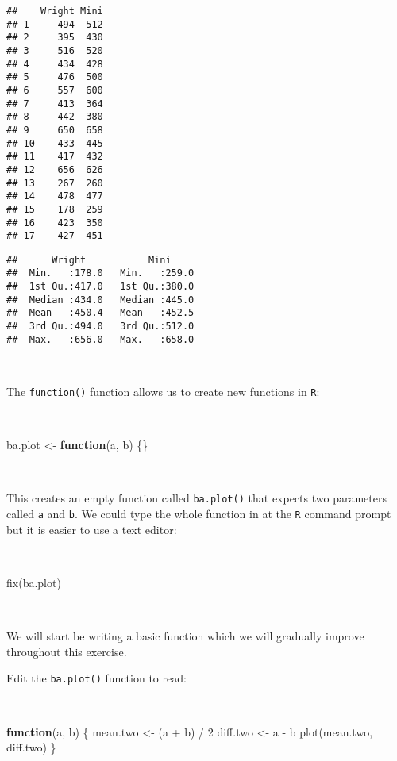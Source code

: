 \documentclass[
  12pt,
  a4paper]{book}
\newenvironment{Shaded}{\begin{snugshade}}{\end{snugshade}}
\newcommand{\ControlFlowTok}[1]{\textcolor[rgb]{0.13,0.29,0.53}{\textbf{#1}}}
\newcommand{\DecValTok}[1]{\textcolor[rgb]{0.00,0.00,0.81}{#1}}
\newcommand{\FunctionTok}[1]{\textcolor[rgb]{0.00,0.00,0.00}{#1}}
\newcommand{\NormalTok}[1]{#1}
\newcommand{\OtherTok}[1]{\textcolor[rgb]{0.56,0.35,0.01}{#1}}
\newcommand{\SpecialCharTok}[1]{\textcolor[rgb]{0.00,0.00,0.00}{#1}}
\begin{document}
\begin{verbatim}
##    Wright Mini
## 1     494  512
## 2     395  430
## 3     516  520
## 4     434  428
## 5     476  500
## 6     557  600
## 7     413  364
## 8     442  380
## 9     650  658
## 10    433  445
## 11    417  432
## 12    656  626
## 13    267  260
## 14    478  477
## 15    178  259
## 16    423  350
## 17    427  451
\end{verbatim}

\begin{verbatim}
##      Wright           Mini      
##  Min.   :178.0   Min.   :259.0  
##  1st Qu.:417.0   1st Qu.:380.0  
##  Median :434.0   Median :445.0  
##  Mean   :450.4   Mean   :452.5  
##  3rd Qu.:494.0   3rd Qu.:512.0  
##  Max.   :656.0   Max.   :658.0
\end{verbatim}

~

The \texttt{function()} function allows us to create new functions in \texttt{R}:

~

\begin{Shaded}
\begin{Highlighting}[]
\NormalTok{ba.plot }\OtherTok{\textless{}{-}} \ControlFlowTok{function}\NormalTok{(a, b) \{\}}
\end{Highlighting}
\end{Shaded}

~

This creates an empty function called \texttt{ba.plot()} that expects two parameters called \texttt{a} and \texttt{b}. We could type the whole function in at the \texttt{R} command prompt but it is easier to use a text editor:

~

\begin{Shaded}
\begin{Highlighting}[]
\FunctionTok{fix}\NormalTok{(ba.plot)}
\end{Highlighting}
\end{Shaded}

~

We will start be writing a basic function which we will gradually improve throughout this exercise.

Edit the \texttt{ba.plot()} function to read:

~

\begin{Shaded}
\begin{Highlighting}[]
\ControlFlowTok{function}\NormalTok{(a, b) \{}
\NormalTok{  mean.two }\OtherTok{\textless{}{-}}\NormalTok{ (a }\SpecialCharTok{+}\NormalTok{ b) }\SpecialCharTok{/} \DecValTok{2}
\NormalTok{  diff.two }\OtherTok{\textless{}{-}}\NormalTok{ a }\SpecialCharTok{{-}}\NormalTok{ b}
  \FunctionTok{plot}\NormalTok{(mean.two, diff.two)}
\NormalTok{\}}
\end{Highlighting}
\end{Shaded}
\end{document}

